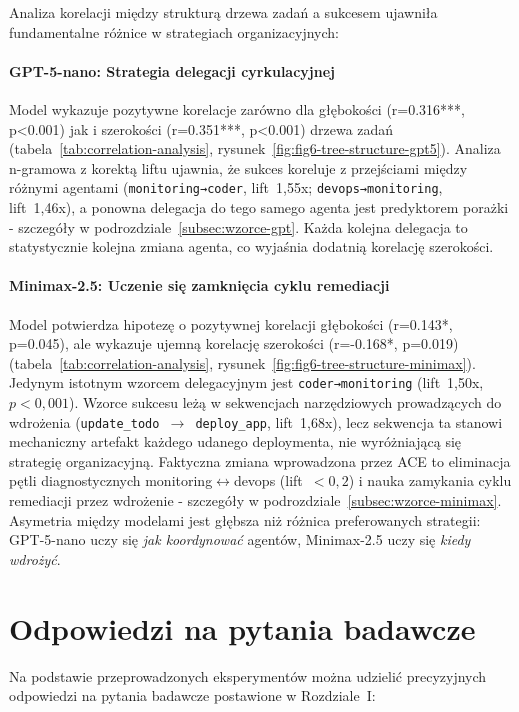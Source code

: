 Analiza korelacji między strukturą drzewa zadań a sukcesem ujawniła fundamentalne różnice w strategiach organizacyjnych:

\paragraph{GPT-5-nano: Strategia delegacji cyrkulacyjnej}
Model wykazuje pozytywne korelacje zarówno dla głębokości (r=0.316***, p<0.001) jak i szerokości (r=0.351***, p<0.001) drzewa zadań (tabela~\ref{tab:correlation-analysis}, rysunek~\ref{fig:fig6-tree-structure-gpt5}). Analiza n-gramowa z korektą liftu ujawnia, że sukces koreluje z przejściami między różnymi agentami (\texttt{monitoring→coder}, lift~1,55x; \texttt{devops→monitoring}, lift~1,46x), a ponowna delegacja do tego samego agenta jest predyktorem porażki - szczegóły w podrozdziale~\ref{subsec:wzorce-gpt}. Każda kolejna delegacja to statystycznie kolejna zmiana agenta, co wyjaśnia dodatnią korelację szerokości.

\paragraph{Minimax-2.5: Uczenie się zamknięcia cyklu remediacji}
Model potwierdza hipotezę o pozytywnej korelacji głębokości (r=0.143*, p=0.045), ale wykazuje ujemną korelację szerokości (r=-0.168*, p=0.019) (tabela~\ref{tab:correlation-analysis}, rysunek~\ref{fig:fig6-tree-structure-minimax}). Jedynym istotnym wzorcem delegacyjnym jest \texttt{coder→monitoring} (lift~1,50x, $p<0{,}001$). Wzorce sukcesu leżą w sekwencjach narzędziowych prowadzących do wdrożenia (\texttt{update\_todo~$\to$~deploy\_app}, lift~1,68x), lecz sekwencja ta stanowi mechaniczny artefakt każdego udanego deploymenta, nie wyróżniającą się strategię organizacyjną. Faktyczna zmiana wprowadzona przez ACE to eliminacja pętli diagnostycznych monitoring$\leftrightarrow$devops (lift~$<0{,}2$) i nauka zamykania cyklu remediacji przez wdrożenie - szczegóły w podrozdziale~\ref{subsec:wzorce-minimax}. Asymetria między modelami jest głębsza niż różnica preferowanych strategii: GPT-5-nano uczy się \emph{jak koordynować} agentów, Minimax-2.5 uczy się \emph{kiedy wdrożyć}.


\section{Odpowiedzi na pytania badawcze}

Na podstawie przeprowadzonych eksperymentów można udzielić precyzyjnych odpowiedzi na pytania badawcze postawione w Rozdziale~I:

